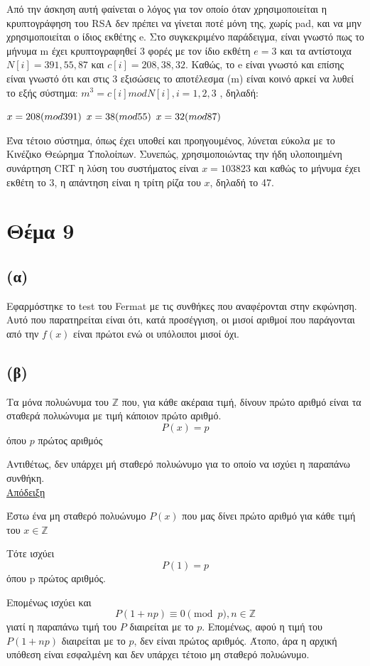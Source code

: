 \documentclass[a4paper, 11pt]{article}
\newcommand{\lt}{\latintext}
\begin{document}
Από την άσκηση αυτή φαίνεται ο λόγος για τον οποίο όταν χρησιμοποιείται η κρυπτογράφηση του {\lt RSA} δεν πρέπει να γίνεται ποτέ μόνη της, χωρίς {\lt pad}, και να μην χρησιμοποιείται ο ίδιος εκθέτης {\lt e}. Στο συγκεκριμένο παράδειγμα, είναι γνωστό πως το μήνυμα {\lt m} έχει κρυπτογραφηθεί 3 φορές με τον ίδιο εκθέτη $ e = 3 $ και τα αντίστοιχα $ N[i] = 391, 55, 87 $ και $ c[i] = 208, 38, 32 $. Καθώς, το {\lt e} είναι γνωστό και επίσης είναι γνωστό ότι και στις 3 εξισώσεις το αποτέλεσμα ({\lt m}) είναι κοινό αρκεί να λυθεί το εξής σύστημα: $ m^3 = c[i] mod N[i] , i = 1,2,3 $ , δηλαδή:

$ x = 208 (mod 391) \\ $
$ x = 38 (mod 55)  \\ $
$ x = 32 (mod 87)  \\ $

Ένα τέτοιο σύστημα, όπως έχει υποθεί και προηγουμένος, λύνεται εύκολα με το Κινέζικο Θεώρημα Υπολοίπων. Συνεπώς, χρησιμοποιώντας την ήδη υλοποιημένη συνάρτηση {\lt CRT} η λύση του συστήματος είναι $ x = 103823 $ και καθώς το μήνυμα έχει εκθέτη το 3, η απάντηση είναι η τρίτη ρίζα του $x$, δηλαδή το 47.


\newpage


\section*{Θέμα 9}
\subsection*{(α)} Εφαρμόστηκε το test του {\lt Fermat} με τις συνθήκες που αναφέρονται στην εκφώνηση. Αυτό που παρατηρείται είναι ότι, κατά προσέγγιση, οι μισοί αριθμοί που παράγονται από την $f(x)$ είναι πρώτοι ενώ οι υπόλοιποι μισοί όχι.
\subsection*{(β)} Τα μόνα πολυώνυμα του $\mathbb{Z}$ που, για κάθε ακέραια τιμή, δίνουν πρώτο αριθμό είναι τα σταθερά πολυώνυμα με τιμή κάποιον πρώτο αριθμό.
\[P(x) = p\] όπου $p$ πρώτος αριθμός

Αντιθέτως, δεν υπάρχει μή σταθερό πολυώνυμο για το οποίο να ισχύει η παραπάνω συνθήκη.\\

\underline{Απόδειξη}

Έστω ένα μη σταθερό πολυώνυμο $P(x)$ που μας δίνει πρώτο αριθμό για κάθε τιμή του $x \in \mathbb{Z}$

Τότε ισχύει
\[P(1) = p\]
όπου p πρώτος αριθμός.

Επομένως ισχύει και
\[P(1 + np) \equiv 0 \pmod{p}, n \in \mathbb{Z} \]
γιατί η παραπάνω τιμή του $P$ διαιρείται με το $p$. Επομένως, αφού η τιμή του $P(1+np)$ διαιρείται με το $p$, δεν είναι πρώτος αριθμός. Άτοπο, άρα η αρχική υπόθεση είναι εσφαλμένη και δεν υπάρχει τέτοιο μη σταθερό πολυώνυμο.
\end{document}

